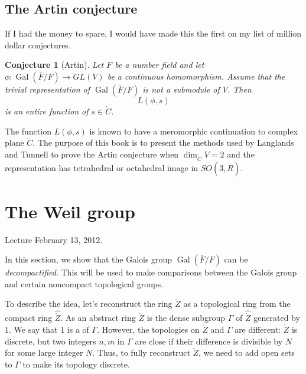 \documentclass{amsart}
\newtheorem{conjecture}[equation]{Conjecture}
\def\op#1{{\operatorname{#1}}}
\def\CC{\ring{C}}
\def\RR{\ring{R}}
\def\oG{\op{Gal}}
\begin{document}
\subsection{The Artin conjecture}

If I had the money to spare, I would have made this the first on my
list of million dollar conjectures.

\begin{conjecture}[Artin] Let $F$ be a number field and let
  $\phi:\oG(\bar F/F)\to GL(V)$ be a continuous homomorphism.
  Assume that the trivial representation of $\oG(\bar F/F)$ is
  not a submodule of $V$.  Then
\[
L(\phi,s)
\]
is an entire function of $s\in \CC$.
\end{conjecture}

The function $L(\phi,s)$ is known to have a meromorphic continuation
to complex plane $\CC$.  The purpose of this book is to
present the methods used by Langlands and Tunnell to prove the Artin
conjecture when $\dim_{\CC}V = 2$ and the representation has
tetrahedral or octahedral image in $SO(3,\RR)$.

\newpage

\section{The Weil group}

Lecture February 13, 2012.

In this section, we show that the Galois group $\oG(\bar F/F)$ can
be {\it decompactified}.  This will be used to make comparisons between
the Galois group and certain noncompact topological groups.  

To describe
the idea, let's reconstruct the ring $\ring{Z}$ as a topological ring
from the compact ring $\hat{\ring{Z}}$.  As an abstract ring $\ring{Z}$
is the dense subgroup $\Gamma$ of $\hat{\ring{Z}}$ generated by
$1$.  We say that $1$ is a  of $\Gamma$.
However, the topologies on $\ring{Z}$ and $\Gamma$ are different:
$\ring{Z}$ is discrete, but two integers $n,m$ in $\Gamma$ are close
if their difference is divisible by $N$ for some large integer $N$.
Thus, to fully reconstruct $\ring{Z}$, we need to add open sets to $\Gamma$
to make its topology discrete.
\end{document}
